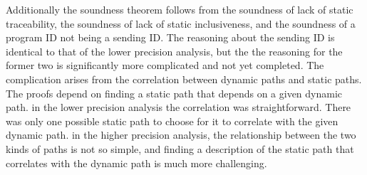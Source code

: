 \documentclass[10pt]{article}
\begin{document}
Additionally the soundness theorem follows from the soundness of lack of static traceability,
the soundness of lack of static inclusiveness,
and the soundness of a program ID not being a sending ID. 
The reasoning about the sending ID is identical to that of the lower precision analysis, but
the the reasoning for the former two is significantly more complicated and not yet completed.
The complication arises from the
correlation between dynamic paths and static paths.  The proofs depend on finding a static 
path that depends on a given dynamic path. in the lower precision analysis the
correlation was straightforward. There was only one possible static path to choose for it
to correlate with the given dynamic path. in the higher precision analysis, the relationship
between the two kinds of paths is not so simple, and finding a description of the static path
that correlates with the dynamic path is much more challenging.
\end{document}
